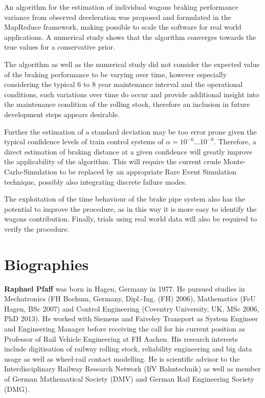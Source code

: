 \documentclass[a4paper, 12pt]{scrartcl}
\begin{document}
An algorithm for the estimation of individual wagons braking performance variance from observed deceleration was proposed and formulated in the MapReduce framework, making possible to scale the software for real world applications. A numerical study shows that the algorithm converges towards the true values for a conservative prior.

The algorithm as well as the numerical study did not consider the expected value of the braking performance to be varying over time, however especially considering the typical 6 to 8 year maintenance interval and the operational conditions, such variations over time do occur and provide additional insight into the maintenance condition of the rolling stock, therefore an inclusion in future development steps appears desirable.

Further the estimation of a standard deviation may be too error prone given the typical confidence levels of train control systems of $\alpha = 10^{-6} \ldots 10^{-9}$. Therefore, a direct estimation of braking distance at a given confidence will greatly improve the applicability of the algorithm. This will require the current crude Monte-Carlo-Simulation to be replaced by an appropriate Rare Event Simulation technique, possibly also integrating discrete failure modes.

The exploitation of the time behaviour of the brake pipe system also has the potential to improve the procedure, as in this way it is more easy to identify the wagons contribution. Finally, trials using real world data will also be required to verify the procedure.







\section*{Biographies}


\noindent\textbf{Raphael Pfaff} was born in Hagen, Germany in 1977. He pursued studies in Mechatronics (FH Bochum, Germany, Dipl.-Ing. (FH) 2006), Mathematics (FeU Hagen, BSc 2007) and Control Engineering (Coventry University, UK, MSc 2006, PhD 2013). He worked with Siemens and Faiveley Transport as System Engineer and Engineering Manager before receiving the call for his current position as Professor of Rail Vehicle Engineering at FH Aachen. His research interests include digitisation of railway rolling stock, reliability engineering and big data usage as well as wheel-rail contact modelling. He is scientific advisor to the Interdisciplinary Railway Research Network (IfV Bahntechnik) as well as  member of German Mathematical Society (DMV) and German Rail Engineering Society (DMG).




%
\end{document}
